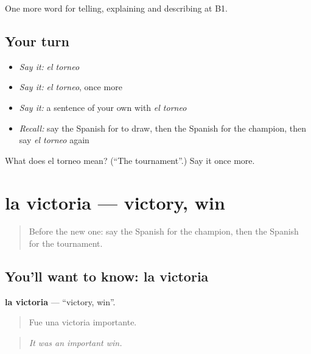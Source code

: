 \begin{grammarlens}[title={What you've built}]
One more word for telling, explaining and describing at B1.
\end{grammarlens}

\subsection*{Your turn}
\begin{itemize}
\raggedright
  \item \emph{Say it:} \emph{el torneo}
  \item \emph{Say it:} \emph{el torneo}, once more
  \item \emph{Say it:} a sentence of your own with \emph{el torneo}
  \item \emph{Recall:} say the Spanish for to draw, then the Spanish for the champion, then say \emph{el torneo} again
\end{itemize}

\begin{tcolorbox}[breakable,colback=teal!4,colframe=teal!35!black,title={Before you move on}]
What does el torneo mean? (\textquotedblleft{}The tournament\textquotedblright{}.) Say it once more.
\end{tcolorbox}
\section[la victoria]{la victoria — victory, win}

\label{lesson:ES-C757-victoria}



\begin{quote}
Before the new one: say the Spanish for the champion, then the Spanish for the tournament.
\end{quote}

\subsection*{You'll want to know: la victoria}
\textbf{la victoria} — \textquotedblleft{}victory, win\textquotedblright{}.

\begin{quote}
Fue una victoria importante.
\end{quote}

\begin{quote}
\emph{It was an important win.}
\end{quote}

